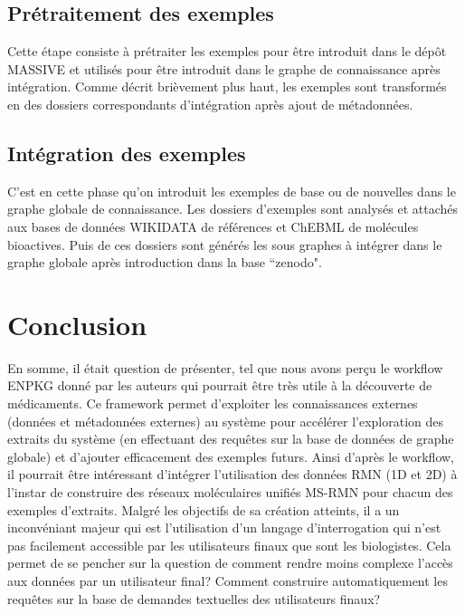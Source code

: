 \documentclass[12pt, french, latin.medieval, a4paper]{report}
\begin{document}
	\subsection{Prétraitement des exemples}
    	Cette étape consiste à prétraiter les exemples pour être introduit dans le dépôt MASSIVE et utilisés pour être introduit dans le graphe de connaissance après intégration.
    	Comme décrit brièvement plus haut, les exemples sont transformés en des dossiers correspondants d'intégration après ajout de métadonnées.

	\subsection{Intégration des exemples}
	C'est en cette phase qu'on introduit les exemples de base ou de nouvelles dans le graphe globale de connaissance.  Les dossiers d'exemples sont analysés et attachés aux bases de données WIKIDATA de références et ChEBML de molécules bioactives. Puis de ces dossiers sont générés les sous graphes à intégrer dans le graphe globale après introduction dans la base “zenodo".
    
	\section{Conclusion}
	En somme, il était question de présenter, tel que nous avons perçu le workflow ENPKG donné par les auteurs qui pourrait être très utile à la découverte de médicaments.
    Ce framework permet d'exploiter les connaissances externes (données et métadonnées externes) au système pour accélérer l'exploration des extraits du système (en effectuant des requêtes sur la base de données de graphe globale) et d’ajouter efficacement des exemples futurs.
	Ainsi d'après le workflow, il pourrait être intéressant d'intégrer l'utilisation des données RMN (1D et 2D) à l'instar de construire des réseaux moléculaires unifiés MS-RMN pour chacun des exemples d'extraits.
    Malgré les objectifs de sa création atteints, il a un inconvéniant majeur qui est l’utilisation d’un langage d'interrogation qui n’est pas facilement accessible par les utilisateurs finaux que sont les biologistes.
    Cela permet de se pencher sur la question de comment rendre moins complexe l’accès aux données par un utilisateur final? Comment construire automatiquement les requêtes sur la base de demandes textuelles des utilisateurs finaux?


    
\end{document}

